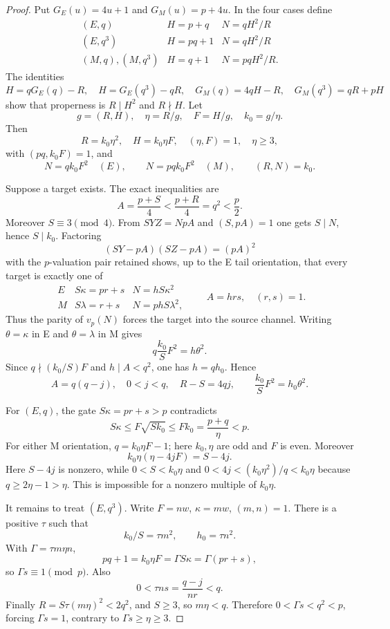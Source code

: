 \documentclass[10pt,reqno]{amsart}
\begin{document}
\begin{proof}
Put $G_E(u)=4u+1$ and $G_M(u)=p+4u$.  In the four cases define
\[
\begin{array}{c|c|c}
(E,q)&H=p+q&N=qH^2/R\\
(E,q^3)&H=pq+1&N=qH^2/R\\
(M,q),(M,q^3)&H=q+1&N=pqH^2/R.
\end{array}
\]
The identities
\[
H=qG_E(q)-R,\quad H=G_E(q^3)-qR,\quad
G_M(q)=4qH-R,\quad G_M(q^3)=qR+pH
\]
show that properness is $R\mid H^2$ and $R\nmid H$.
Let
\[
g=(R,H),\quad \eta=R/g,\quad F=H/g,\quad k_0=g/\eta.
\]
Then
\[
R=k_0\eta^2,\quad H=k_0\eta F,\quad
(\eta,F)=1,\quad\eta\ge3,
\]
with $(pq,k_0F)=1$, and
\[
N=qk_0F^2\quad(E),\qquad N=pqk_0F^2\quad(M),\qquad
(R,N)=k_0.
\]

Suppose a target exists.  The exact inequalities are
\[
A=\frac{p+S}{4}<\frac{p+R}{4}=q^2<\frac p2.
\]
Moreover $S\equiv3\pmod4$.  From $SYZ=NpA$ and
$(S,pA)=1$ one gets $S\mid N$, hence $S\mid k_0$.
Factoring
\[
(SY-pA)(SZ-pA)=(pA)^2
\]
with the $p$-valuation pair retained shows, up to the E tail orientation,
that every target is exactly one of
\[
\begin{array}{c|c|c}
E&S\kappa=pr+s&N=hS\kappa^2\\
M&S\lambda=r+s&N=phS\lambda^2,
\end{array}
\qquad A=hrs,\quad(r,s)=1.
\]
Thus the parity of $v_p(N)$ forces the target into the source channel.
Writing $\theta=\kappa$ in E and $\theta=\lambda$ in M gives
\[
q\frac{k_0}{S}F^2=h\theta^2.
\]
Since $q\nmid(k_0/S)F$ and $h\mid A<q^2$, one has
$h=qh_0$.  Hence
\[
A=q(q-j),\quad0<j<q,\quad R-S=4qj,\qquad
\frac{k_0}{S}F^2=h_0\theta^2.
\]

For $(E,q)$, the gate $S\kappa=pr+s>p$ contradicts
\[
S\kappa\le F\sqrt{Sk_0}\le Fk_0
=\frac{p+q}{\eta}<p.
\]
For either M orientation, $q=k_0\eta F-1$; here $k_0,\eta$ are odd and
$F$ is even.  Moreover
\[
k_0\eta(\eta-4jF)=S-4j.
\]
Here $S-4j$ is nonzero, while
$0<S<k_0\eta$ and
$0<4j<(k_0\eta^2)/q<k_0\eta$ because
$q\ge2\eta-1>\eta$.  This is impossible for a nonzero multiple of
$k_0\eta$.

It remains to treat $(E,q^3)$.  Write
$F=nw$, $\kappa=mw$, $(m,n)=1$.  There is a positive $\tau$ such that
\[
k_0/S=\tau m^2,\qquad h_0=\tau n^2.
\]
With $\Gamma=\tau m\eta n$,
\[
pq+1=k_0\eta F=\Gamma S\kappa=\Gamma(pr+s),
\]
so $\Gamma s\equiv1\pmod p$.  Also
\[
0<\tau ns=\frac{q-j}{nr}<q.
\]
Finally $R=S\tau(m\eta)^2<2q^2$, and $S\ge3$, so
$m\eta<q$.  Therefore
$0<\Gamma s<q^2<p$, forcing $\Gamma s=1$, contrary to
$\Gamma s\ge\eta\ge3$.
\end{proof}
\end{document}
